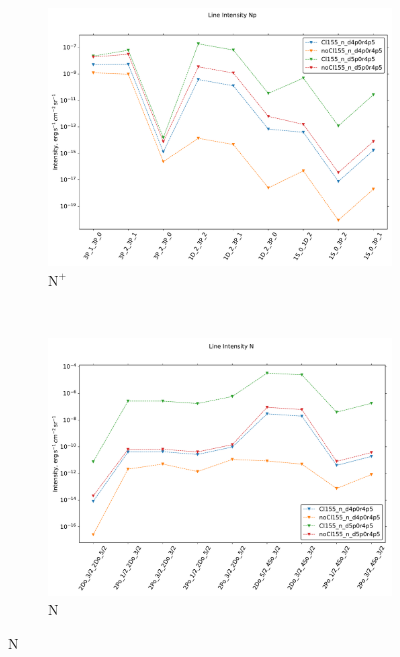 \begin{figure}[!htbp]
    \centering
    \begin{subfigure}[t]{0.45\textwidth} %
        \centering \includegraphics[trim = {0 0 0 1.5cm},clip,width=1\textwidth]{figure/Cl/gridModelEmiss/I_comp_Np.pdf}
        \caption{$\mathrm{N}^+$}
    \end{subfigure}
    ~ 
   \begin{subfigure}[t]{0.45\textwidth} %
        \centering \includegraphics[trim = {0 0 0 1.5cm},clip,width=1\textwidth]{figure/Cl/gridModelEmiss/I_comp_N.pdf}
        \caption{$\mathrm{N}$}
    \end{subfigure}
    

\end{figure}
